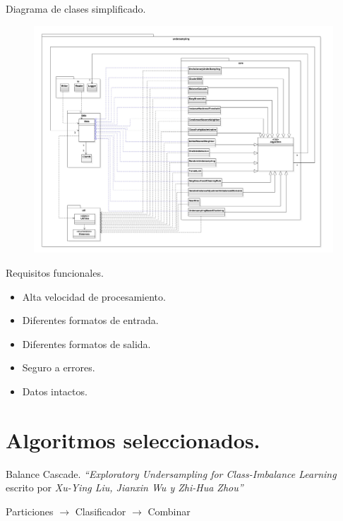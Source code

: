 \documentclass[10pt]{beamer}
\begin{document}
\begin{frame}[fragile]{Diagrama de clases simplificado.}
	\begin{figure}[H]
	\centering
	\includegraphics[scale=0.09]{./imagenes/3_clases_simplificado}
	\end{figure}
\end{frame}

\begin{frame}[fragile]{Requisitos funcionales.}
	\begin{itemize}
		\item Alta velocidad de procesamiento.
		\item Diferentes formatos de entrada.
		\item Diferentes formatos de salida.
		\item Seguro a errores.
		\item Datos intactos.
	\end{itemize}
\end{frame}

\section{Algoritmos seleccionados.}

\begin{frame}[fragile]{Balance Cascade.}
\textit{``Exploratory Undersampling for Class-Imbalance Learning} escrito por \textit{Xu-Ying Liu, Jianxin Wu y Zhi-Hua Zhou''} \cite{bc-ee} \\
\bigskip
\bigskip

Particiones $\rightarrow$ Clasificador $\rightarrow$ Combinar
\end{frame}
\end{document}
